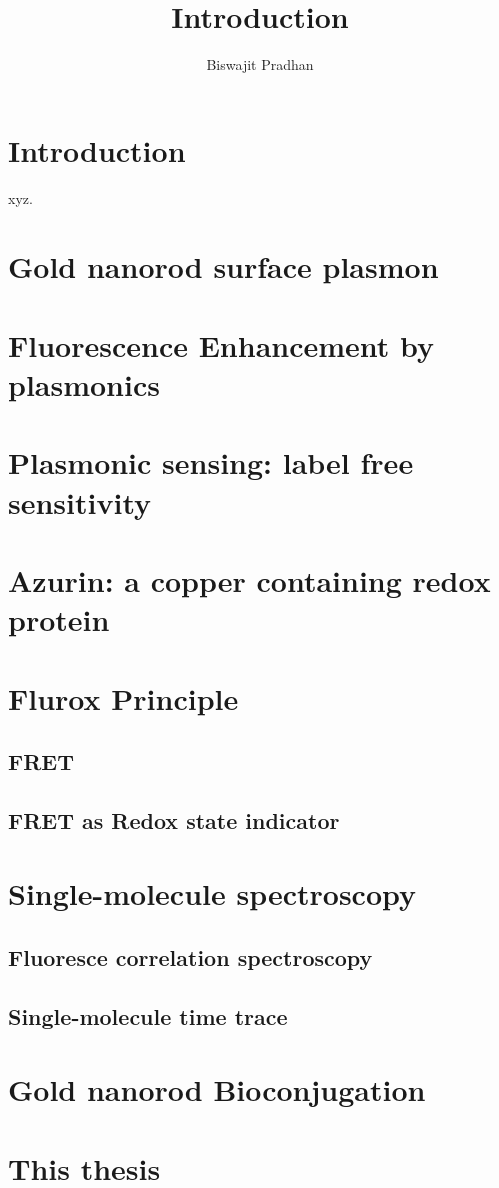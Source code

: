\documentclass[11pt,a4paper,onecolumn]{article}
\begin{document}
\title{\textbf{Introduction}}
\author{Biswajit Pradhan}
\maketitle
\section{Introduction}
xyz\cite{gregor2006timeresolved}.\cite{}
\section{Gold nanorod surface plasmon}
\section{Fluorescence Enhancement by plasmonics}
\section{Plasmonic sensing: label free sensitivity}
\section{Azurin: a copper containing redox protein}
\section{Flurox Principle}
\subsection{FRET}
\subsection{FRET as Redox state indicator}
\section{Single-molecule spectroscopy}
\subsection{Fluoresce correlation spectroscopy}
\subsection{Single-molecule time trace}
\section{Gold nanorod Bioconjugation}
\section{This thesis}


\end{document}
